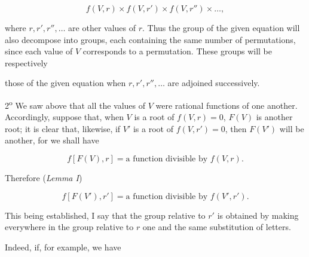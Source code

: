 \[
f(V,r)\times f(V,r')\times f(V,r'')\times\ldots,
\]

where $r,r',r'',\ldots$ are other values of $r$. Thus the group of the given
equation will also decompose into groups, each containing the same number of
permutations, since each value of $V$ corresponds to a permutation. These
groups will be respectively



those of the given equation when $r,r',r'',\ldots$ are adjoined successively.

2\textsuperscript{o} We saw above that all the values of $V$ were rational functions
of one another. Accordingly, suppose that, when $V$ is a root of $f(V,r)=0$,
$F(V)$ is another root; it is clear that, likewise, if $V'$ is a root of
$f(V,r')=0$, then $F(V')$ will be another, for we shall have

\[
f[F(V),r]=\text{a function divisible by }f(V,r).
\]

Therefore (\emph{Lemma I})

\[
f[F(V'),r']=\text{a function divisible by }f(V',r').
\]

This being established, I say that the group relative to $r'$ is obtained by
making everywhere in the group relative to $r$ one and the same substitution
of letters.

Indeed, if, for example, we have

